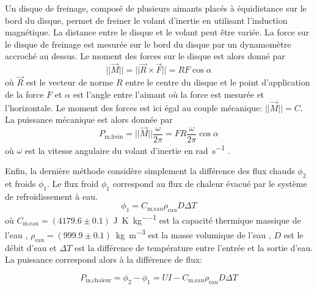 Un disque de freinage, composé de plusieurs aimants placés à équidistance sur le bord du disque, permet de freiner le volant d'inertie en utilisant l'induction magnétique. La distance entre le disque et le volant peut être variée. La force sur le disque de freinage est mesurée sur le bord du disque par un dynamomètre accroché au dessus. Le moment des forces sur le disque est alors donné par
\begin{equation}
    ||\vec{M}|| = ||\vec{R} \times \vec{F}|| = RF \cos{\alpha}
    \label{eq:couple}
\end{equation}
où \(\vec{R}\) est le vecteur de norme \(R\) entre le centre du disque et le point d'application de la force \(F\) et \(\alpha\) est l'angle entre l'aimant où la force est mesurée et l'horizontale. Le moment des forces est ici égal au couple mécanique: \(||\vec{M}|| = C\). La puissance mécanique est alors donnée par
\begin{equation}
    P_\textrm{m,frein} = ||\vec{M}||\frac{\omega}{2 \pi} = F R \frac{\omega}{2 \pi} \cos{\alpha}
    \label{eq:pm_frein}
\end{equation}
où \(\omega\) est la vitesse angulaire du volant d'inertie en \si{\radian\per\second} \cite{chadsermet}. 

Enfin, la dernière méthode considère simplement la différence des flux chauds \(\phi_2\) et froids \(\phi_1\). Le flux froid \(\phi_1\) correspond au flux de chaleur évacué par le système de refroidissement à eau.
\begin{equation}
    \phi_1 = C_\textrm{m,eau} \rho_\textrm{eau} D \Delta T
\end{equation}
où \(C_\textrm{m,eau} = (4179.6 \pm 0.1)\) \si{\joule\per\kelvin\per\kilo\gram} est la capacité thermique massique de l'eau \cite{proprietes-eau}, \mbox{\(\rho_\textrm{eau} = (999.9 \pm 0.1)\) \si{\kilo\gram\per\meter\cubed}} est la masse volumique de l'eau \cite{proprietes-eau}, \(D\) est le débit d'eau et \(\Delta T\) est la différence de température entre l'entrée et la sortie d'eau. La puissance correspond alors à la différence de flux:

\begin{equation}
    P_\textrm{m,chaleur} = \phi_2 - \phi_1 = UI - C_\textrm{m,eau} \rho_\textrm{eau} D \Delta T
    \label{eq:pm_chaleur}
\end{equation}

